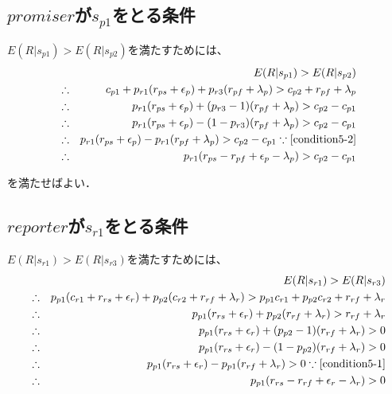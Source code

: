 \subsection{$promiser$が$s_{p1}$をとる条件}

$ E(R|s_{p1}) > E(R|s_{p2}) $を満たすためには、
\begin{eqnarray}
  &&E(R|s_{p1}) > E(R|s_{p2}) \nonumber \\
  &\therefore& c_{p1} + p_{r1} (r_{ps} + \epsilon_p) + p_{r3} (r_{pf} + \lambda_p) > c_{p2} + r_{pf} + \lambda_p \nonumber \\
  &\therefore& p_{r1} (r_{ps} + \epsilon_p) + (p_{r3} - 1) (r_{pf} + \lambda_p) > c_{p2} - c_{p1} \nonumber \\
  &\therefore& p_{r1} (r_{ps} + \epsilon_p) - (1 - p_{r3}) (r_{pf} + \lambda_p) > c_{p2} - c_{p1} \nonumber \\
  &\therefore& p_{r1} (r_{ps} + \epsilon_p) - p_{r1} (r_{pf} + \lambda_p) > c_{p2} - c_{p1} \because\eqref{condition5-2} \nonumber \\
  &\therefore& p_{r1} (r_{ps} - r_{pf} + \epsilon_p - \lambda_p) > c_{p2} - c_{p1}
\end{eqnarray}

を満たせばよい．

\subsection{$reporter$が$s_{r1}$をとる条件}

$ E(R|s_{r1}) > E(R|s_{r3}) $を満たすためには、
\begin{eqnarray}
  &&E(R|s_{r1}) > E(R|s_{r3}) \nonumber \\
  &\therefore& p_{p1} (c_{r1} + r_{rs} + \epsilon_r) + p_{p2} (c_{r2} + r_{rf} + \lambda_r) > p_{p1} c_{r1} + p_{p2} c_{r2} + r_{rf} + \lambda_r \nonumber \\
  &\therefore& p_{p1} (r_{rs} + \epsilon_r) + p_{p2} (r_{rf} + \lambda_r) > r_{rf} + \lambda_r \nonumber\\
  &\therefore& p_{p1} (r_{rs} + \epsilon_r) + (p_{p2} - 1) (r_{rf} + \lambda_r) > 0 \nonumber \\
  &\therefore& p_{p1} (r_{rs} + \epsilon_r) - (1 - p_{p2}) (r_{rf} + \lambda_r) > 0 \nonumber \\
  &\therefore& p_{p1} (r_{rs} + \epsilon_r) - p_{p1} (r_{rf} + \lambda_r) > 0 \because\eqref{condition5-1} \nonumber \\
  &\therefore& p_{p1}(r_{rs} - r_{rf} + \epsilon_r - \lambda_r) > 0
\end{eqnarray}

